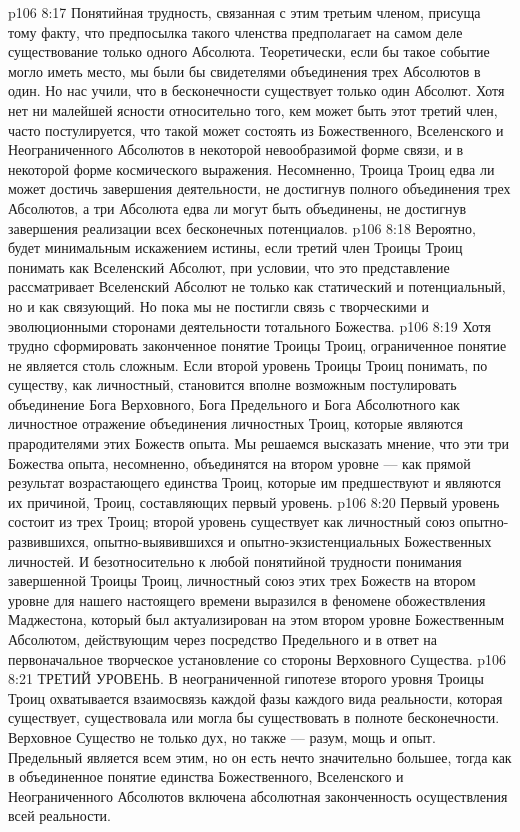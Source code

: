 \vs p106 8:17 Понятийная трудность, связанная с этим третьим членом, присуща тому факту, что предпосылка такого членства предполагает на самом деле существование только одного Абсолюта. Теоретически, если бы такое событие могло иметь место, мы были бы свидетелями  объединения трех Абсолютов в один. Но нас учили, что в бесконечности  существует только один Абсолют. Хотя нет ни малейшей ясности относительно того, кем может быть этот третий член, часто постулируется, что такой может состоять из Божественного, Вселенского и Неограниченного Абсолютов в некоторой невообразимой форме связи, и в некоторой форме космического выражения. Несомненно, Троица Троиц едва ли может достичь завершения деятельности, не достигнув полного объединения трех Абсолютов, а три Абсолюта едва ли могут быть объединены, не достигнув завершения реализации всех бесконечных потенциалов.
\vs p106 8:18 Вероятно, будет минимальным искажением истины, если третий член Троицы Троиц понимать как Вселенский Абсолют, при условии, что это представление рассматривает Вселенский Абсолют не только как статический и потенциальный, но и как связующий. Но пока мы не постигли связь с творческими и эволюционными сторонами деятельности тотального Божества.
\vs p106 8:19 Хотя трудно сформировать законченное понятие Троицы Троиц, ограниченное понятие не является столь сложным. Если второй уровень Троицы Троиц понимать, по существу, как личностный, становится вполне возможным постулировать объединение Бога Верховного, Бога Предельного и Бога Абсолютного как личностное отражение объединения личностных Троиц, которые являются прародителями этих Божеств опыта. Мы решаемся высказать мнение, что эти три Божества опыта, несомненно, объединятся на втором уровне --- как прямой результат возрастающего единства Троиц, которые им предшествуют и являются их причиной, Троиц, составляющих первый уровень.
\vs p106 8:20 Первый уровень состоит из трех Троиц; второй уровень существует как личностный союз опытно\hyp{}развившихся, опытно\hyp{}выявившихся и опытно\hyp{}экзистенциальных Божественных личностей. И безотносительно к любой понятийной трудности понимания завершенной Троицы Троиц, личностный союз этих трех Божеств на втором уровне для нашего настоящего времени выразился в феномене обожествления Маджестона, который был актуализирован на этом втором уровне Божественным Абсолютом, действующим через посредство Предельного и в ответ на первоначальное творческое установление со стороны Верховного Существа.
\vs p106 8:21 ТРЕТИЙ УРОВЕНЬ. В неограниченной гипотезе второго уровня Троицы Троиц охватывается взаимосвязь каждой фазы каждого вида реальности, которая существует, существовала или могла бы существовать в полноте бесконечности. Верховное Существо не только дух, но также --- разум, мощь и опыт. Предельный является всем этим, но он есть нечто значительно большее, тогда как в объединенное понятие единства Божественного, Вселенского и Неограниченного Абсолютов включена абсолютная законченность осуществления всей реальности.
